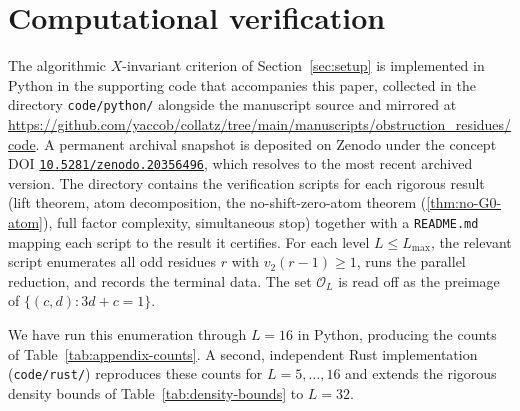\documentclass[11pt,reqno]{amsart}
\newcommand{\Obs}{\mathcal{O}}
\newcommand{\vtwo}{v_{2}}
\begin{document}
\appendix
\section{Computational verification}
\label{sec:appendix}

The algorithmic $X$-invariant criterion of Section~\ref{sec:setup} is
implemented in Python in the supporting code that accompanies this paper,
collected in the directory \texttt{code/python/} alongside the manuscript
source and mirrored at
\url{https://github.com/yaccob/collatz/tree/main/manuscripts/obstruction_residues/code}.
A permanent archival snapshot is deposited on Zenodo under the concept DOI
\href{https://doi.org/10.5281/zenodo.20356496}{\texttt{10.5281/zenodo.20356496}},
which resolves to the most recent archived version.
The directory contains the verification
scripts for each rigorous result (lift theorem, atom decomposition,
the no-shift-zero-atom theorem (\cref{thm:no-G0-atom}), full factor
complexity, simultaneous stop) together with a
\texttt{README.md} mapping each script to the result it certifies. For
each level $L \le L_{\max}$, the relevant script enumerates all odd
residues $r$ with $\vtwo(r-1) \ge 1$, runs the parallel reduction, and
records the terminal data. The set $\Obs_L$ is read off as the preimage of
$\{(c, d) : 3d + c = 1\}$.

We have run this enumeration through $L = 16$ in Python, producing the counts
of Table~\ref{tab:appendix-counts}. A second, independent Rust implementation
(\texttt{code/rust/}) reproduces these counts for $L = 5, \dots, 16$ and
extends the rigorous density bounds of Table~\ref{tab:density-bounds} to
$L = 32$.
\end{document}
